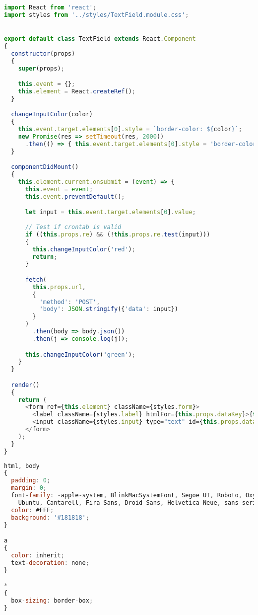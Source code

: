 \documentclass[a4paper,12pt,twoside,openright,titlepage]{book}
\begin{document}
\begin{lstlisting}[title={raspberrypi/ui/components/TextField.js}, language=JavaScript]
import React from 'react';
import styles from '../styles/TextField.module.css';


export default class TextField extends React.Component
{
  constructor(props)
  {
    super(props);

    this.event = {};
    this.element = React.createRef();
  }

  changeInputColor(color)
  {
    this.event.target.elements[0].style = `border-color: ${color}`;
    new Promise(res => setTimeout(res, 2000))
      .then(() => { this.event.target.elements[0].style = 'border-color: transperent'; });
  }

  componentDidMount()
  {
    this.element.current.onsubmit = (event) => {
      this.event = event;
      this.event.preventDefault();

      let input = this.event.target.elements[0].value;
      
      // Test if crontab is valid
      if ((this.props.re) && (!this.props.re.test(input)))
      {
        this.changeInputColor('red');
        return;
      }

      fetch(
        this.props.url,
        {
          'method': 'POST',
          'body': JSON.stringify({'data': input})
        }
      )
        .then(body => body.json())
        .then(j => console.log(j));

      this.changeInputColor('green');
    }
  }

  render()
  {
    return (
      <form ref={this.element} className={styles.form}>
        <label className={styles.label} htmlFor={this.props.dataKey}>{this.props.text}</label>
        <input className={styles.input} type="text" id={this.props.dataKey} name={this.props.dataKey} placeholder={this.props.placeHolder}/>
      </form>
    );
  }
}
\end{lstlisting}

\bigskip

\begin{lstlisting}[title={raspberrypi/ui/styles/globals.css}, language=JavaScript]
html, body
{
  padding: 0;
  margin: 0;
  font-family: -apple-system, BlinkMacSystemFont, Segoe UI, Roboto, Oxygen,
    Ubuntu, Cantarell, Fira Sans, Droid Sans, Helvetica Neue, sans-serif;
  color: #FFF;
  background: '#181818';
}

a
{
  color: inherit;
  text-decoration: none;
}

*
{
  box-sizing: border-box;
}
\end{lstlisting}
\end{document}
